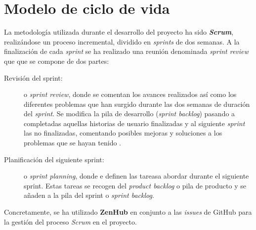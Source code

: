 \newpage

\section{Modelo de ciclo de vida}
La metodología utilizada durante el desarrollo del proyecto ha sido \textit{\textbf{Scrum}}, realizándose un proceso incremental, dividido en \textit{sprints} de dos semanas. A la finalización de cada \textit{sprint} se ha realizado una reunión denominada \textit{sprint review} que que se compone de dos partes:
\begin{description}
	\item [Revisión del sprint:] o \textit{sprint review}, donde se comentan los avances realizados así como los diferentes problemas que han surgido durante las dos semanas de duración del \textit{sprint}.
Se modifica la pila de desarrollo (\textit{sprint backlog}) pasando a completadas aquellas historias de usuario finalizadas y al siguiente \textit{sprint} las no finalizadas, comentando posibles mejoras y soluciones a los problemas que se hayan tenido \cite{scrum_master_scrum_2019}.

	\item [Planificación del siguiente sprint:] o \textit{sprint planning}, donde e definen las tareasa abordar  durante el siguiente sprint. Estas tareas se recogen del \textit{product backlog} o pila de producto y se añaden a la pila del sprint o \textit{sprint backlog}.
\end{description}

	Concretamente, se ha utilizado \textbf{ZenHub} en conjunto a las \textit{issues} de GitHub para la gestión del proceso \textit{Scrum} en el proyecto.

